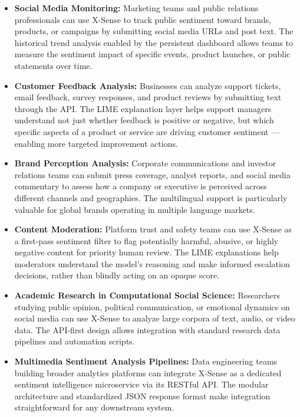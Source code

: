 \documentclass[12pt, a4paper]{report}
\begin{document}
\begin{itemize}[noitemsep, leftmargin=1.5em]
    \item \textbf{Social Media Monitoring:} Marketing teams and public relations professionals can use X-Sense to track public sentiment toward brands, products, or campaigns by submitting social media URLs and post text. The historical trend analysis enabled by the persistent dashboard allows teams to measure the sentiment impact of specific events, product launches, or public statements over time.

    \item \textbf{Customer Feedback Analysis:} Businesses can analyze support tickets, email feedback, survey responses, and product reviews by submitting text through the API. The LIME explanation layer helps support managers understand not just whether feedback is positive or negative, but which specific aspects of a product or service are driving customer sentiment --- enabling more targeted improvement actions.

    \item \textbf{Brand Perception Analysis:} Corporate communications and investor relations teams can submit press coverage, analyst reports, and social media commentary to assess how a company or executive is perceived across different channels and geographies. The multilingual support is particularly valuable for global brands operating in multiple language markets.

    \item \textbf{Content Moderation:} Platform trust and safety teams can use X-Sense as a first-pass sentiment filter to flag potentially harmful, abusive, or highly negative content for priority human review. The LIME explanations help moderators understand the model's reasoning and make informed escalation decisions, rather than blindly acting on an opaque score.

    \item \textbf{Academic Research in Computational Social Science:} Researchers studying public opinion, political communication, or emotional dynamics on social media can use X-Sense to analyze large corpora of text, audio, or video data. The API-first design allows integration with standard research data pipelines and automation scripts.

    \item \textbf{Multimedia Sentiment Analysis Pipelines:} Data engineering teams building broader analytics platforms can integrate X-Sense as a dedicated sentiment intelligence microservice via its RESTful API. The modular architecture and standardized JSON response format make integration straightforward for any downstream system.


\end{itemize}
\end{document}
